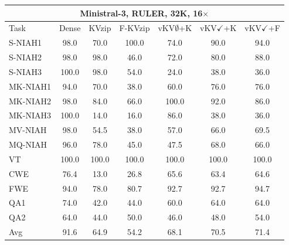 \begin{tabular}{lcccccc}
\toprule
\multicolumn{7}{c}{Ministral-3, RULER, 32K, 16$\times$} \\
\midrule
Task & Dense & KVzip & F-KVzip & vKV$\emptyset$+K & vKV$\checkmark$+K & vKV$\checkmark$+F \\
\midrule
S-NIAH1 & 98.0 & 70.0 & 100.0 & 74.0 & 90.0 & 94.0 \\
S-NIAH2 & 98.0 & 98.0 & 46.0 & 72.0 & 80.0 & 88.0 \\
S-NIAH3 & 100.0 & 98.0 & 54.0 & 24.0 & 38.0 & 36.0 \\
MK-NIAH1 & 94.0 & 70.0 & 38.0 & 60.0 & 76.0 & 76.0 \\
MK-NIAH2 & 98.0 & 84.0 & 66.0 & 100.0 & 92.0 & 86.0 \\
MK-NIAH3 & 100.0 & 14.0 & 16.0 & 86.0 & 38.0 & 36.0 \\
MV-NIAH & 98.0 & 54.5 & 38.0 & 57.0 & 66.0 & 69.5 \\
MQ-NIAH & 96.0 & 78.0 & 45.0 & 47.5 & 68.0 & 66.0 \\
VT & 100.0 & 100.0 & 100.0 & 100.0 & 100.0 & 100.0 \\
CWE & 76.4 & 13.0 & 26.8 & 65.6 & 63.4 & 64.6 \\
FWE & 94.0 & 78.0 & 80.7 & 92.7 & 92.7 & 94.7 \\
QA1 & 74.0 & 42.0 & 44.0 & 60.0 & 64.0 & 64.0 \\
QA2 & 64.0 & 44.0 & 50.0 & 46.0 & 48.0 & 54.0 \\
\midrule
Avg & 91.6 & 64.9 & 54.2 & 68.1 & 70.5 & 71.4 \\
\bottomrule
\end{tabular}
\vspace{0.8em}

